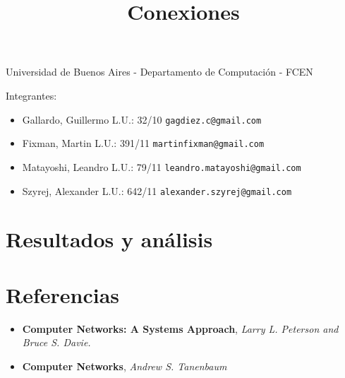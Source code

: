 \documentclass[a4paper,11pt]{article}
\title{Conexiones}
\begin{document}
\maketitle

\begin{center}
	Universidad de Buenos Aires - Departamento de Computaci\'on - FCEN
\end{center}

\vspace{2cm}
Integrantes:

\begin{itemize}
	\item Gallardo, Guillermo L.U.: 32/10 \verb+gagdiez.c@gmail.com+
	\item Fixman, Martin L.U.: 391/11 \verb+martinfixman@gmail.com+
	\item Matayoshi, Leandro L.U.: 79/11 \verb+leandro.matayoshi@gmail.com+
	\item Szyrej, Alexander L.U.: 642/11 \verb+alexander.szyrej@gmail.com+

\end{itemize}

\newpage

\tableofcontents

\newpage








\section{Resultados y análisis}


%


\section{Referencias}
\begin{itemize}
	\item \textbf{Computer Networks: A Systems Approach}, \textit{Larry L. Peterson and Bruce S. Davie.}
	\item \textbf{Computer Networks}, \textit{Andrew S. Tanenbaum}
\end{itemize}
\end{document}
